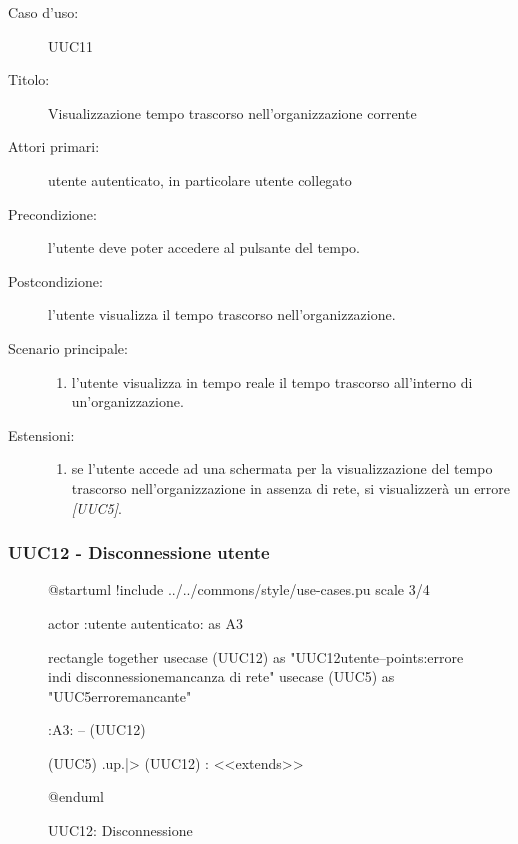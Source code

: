 \documentclass[casi-duso]{subfiles}
\begin{document}
\begin{description}
  \item[Caso d’uso:] UUC11
  \item[Titolo:] Visualizzazione tempo trascorso nell'organizzazione corrente
  \item[Attori primari:] utente autenticato, in particolare utente collegato
  \item[Precondizione:] l'utente deve poter accedere al pulsante del tempo.
  \item[Postcondizione:] l'utente visualizza il tempo trascorso nell'organizzazione.
  \item[Scenario principale:]
        \begin{enumerate}
          \item l'utente visualizza in tempo reale il tempo trascorso all'interno di un'organizzazione.
        \end{enumerate}
  \item[Estensioni:]
        \begin{enumerate}
          \item se l'utente accede ad una schermata per la visualizzazione del tempo trascorso nell'organizzazione in assenza di rete, si visualizzerà un errore \emph{[UUC5]}.
        \end{enumerate}
\end{description}

\subsubsection{UUC12 - Disconnessione utente}%
\label{subsub:UUC12utente}

\begin{figure}[h!]
  \centering
  \begin{plantuml}
  @startuml
  !include ../../commons/style/use-cases.pu
  scale 3/4

  actor :utente autenticato: as A3

  rectangle {
    together {
      usecase (UUC12) as "UUC12\nDisconnessione utente\n--\nExtension points:\nVisualizzazione errore in\ncaso di disconnessione\nin mancanza di rete"
      usecase (UUC5) as "UUC5\nVisualizzazione errore\nrete mancante"
    }
  }

  :A3: -- (UUC12)

  (UUC5) .up.|> (UUC12) : <<extends>>

  @enduml
  \end{plantuml}
  \caption{UUC12: Disconnessione}
  \label{fig:uuc12}
\end{figure}
\end{document}
